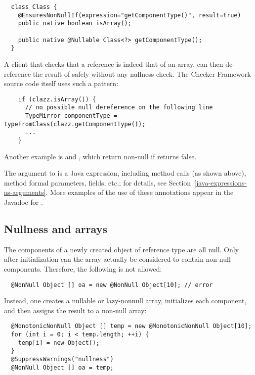 \begin{Verbatim}
  class Class {
    @EnsuresNonNullIf(expression="getComponentType()", result=true)
    public native boolean isArray();

    public native @Nullable Class<?> getComponentType();
  }
\end{Verbatim}

A client that checks that a  reference is indeed that of an array,
can then de-reference the result of  safely
without any nullness check.  The Checker Framework source code itself
uses such a pattern:

\begin{Verbatim}
    if (clazz.isArray()) {
      // no possible null dereference on the following line
      TypeMirror componentType = typeFromClass(clazz.getComponentType());
      ...
    }
\end{Verbatim}

Another example is 
and , which return
non-null if 
returns false.

The argument to  is a Java expression, including method calls
(as shown above), method formal parameters, fields, etc.; for details, see
Section~\ref{java-expressions-as-arguments}.
More examples of the use of these annotations appear in the Javadoc for
.


\subsection{Nullness and arrays\label{nullness-arrays}}

The components of a newly created object of reference type are all
null. Only after initialization can the array actually be considered
to contain non-null components.
Therefore, the following is not allowed:

\begin{Verbatim}
  @NonNull Object [] oa = new @NonNull Object[10]; // error
\end{Verbatim}

Instead, one creates a nullable or lazy-nonnull array, initializes
each component, and then assigns the result to a non-null array:

\begin{Verbatim}
  @MonotonicNonNull Object [] temp = new @MonotonicNonNull Object[10];
  for (int i = 0; i < temp.length; ++i) {
    temp[i] = new Object();
  }
  @SuppressWarnings("nullness")
  @NonNull Object [] oa = temp;
\end{Verbatim}

